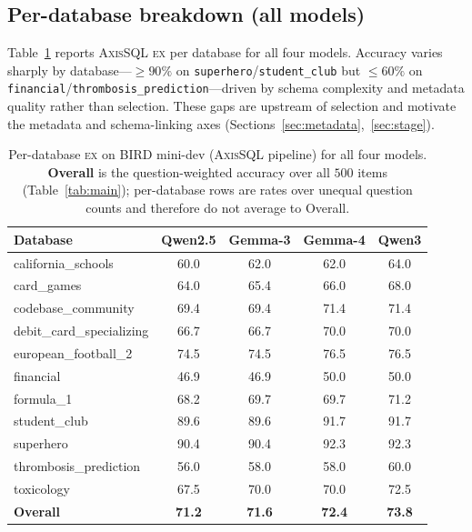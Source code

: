 \documentclass{article}
\newcommand{\sys}{\textsc{AxisSQL}\xspace}
\newcommand{\ex}{\textsc{ex}\xspace}
\begin{document}
\subsection{Per-database breakdown (all models)}
\label{app:perdb}
Table~\ref{tab:s-perdb} reports \sys{} \ex{} per database for all four models. Accuracy varies sharply by database---$\ge 90\%$ on \texttt{superhero}/\texttt{student\_club} but $\le 60\%$ on \texttt{financial}/\texttt{thrombosis\_prediction}---driven by schema complexity and metadata quality rather than selection. These gaps are upstream of selection and motivate the metadata and schema-linking axes (Sections~\ref{sec:metadata},~\ref{sec:stage}).

\begin{table}[h]
\centering\small
\caption{Per-database \ex{} on BIRD mini-dev (\sys{} pipeline) for all four models. \textbf{Overall} is the question-weighted accuracy over all $500$ items (Table~\ref{tab:main}); per-database rows are rates over unequal question counts and therefore do not average to Overall.}
\label{tab:s-perdb}
\begin{tabular}{@{}lcccc@{}}
\toprule
\textbf{Database} & \textbf{Qwen2.5} & \textbf{Gemma-3} & \textbf{Gemma-4} & \textbf{Qwen3} \\
\midrule
california\_schools       & 60.0 & 62.0 & 62.0 & 64.0 \\
card\_games               & 64.0 & 65.4 & 66.0 & 68.0 \\
codebase\_community       & 69.4 & 69.4 & 71.4 & 71.4 \\
debit\_card\_specializing & 66.7 & 66.7 & 70.0 & 70.0 \\
european\_football\_2     & 74.5 & 74.5 & 76.5 & 76.5 \\
financial                 & 46.9 & 46.9 & 50.0 & 50.0 \\
formula\_1                & 68.2 & 69.7 & 69.7 & 71.2 \\
student\_club             & 89.6 & 89.6 & 91.7 & 91.7 \\
superhero                 & 90.4 & 90.4 & 92.3 & 92.3 \\
thrombosis\_prediction    & 56.0 & 58.0 & 58.0 & 60.0 \\
toxicology                & 67.5 & 70.0 & 70.0 & 72.5 \\
\midrule
\textbf{Overall}          & \textbf{71.2} & \textbf{71.6} & \textbf{72.4} & \textbf{73.8} \\
\bottomrule
\end{tabular}
\end{table}
\end{document}
